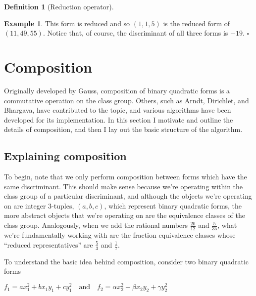 \documentclass{article}
\theoremstyle{definition}
\newtheorem{definition}{Definition}[section]
\theoremstyle{theorem}
\theoremstyle{example}
\newtheorem{example}{Example}[section]
\theoremstyle{corollary}
\begin{document}
\begin{definition}[Reduction operator]
\begin{example}
\bigskip

This form is reduced and so \((1, 1, 5)\) is the reduced form of \((11, 49, 55)\). Notice that, of course, the discriminant of all three forms is \(-19\). \(\square\)

\end{example}





\bigskip




\section{Composition}

\bigskip

Originally developed by Gauss, composition of binary quadratic forms is a commutative operation on the class group. Others, such as Arndt, Dirichlet, and Bhargava, have contributed to the topic, and various algorithms have been developed for its implementation. In this section I motivate and outline the details of composition, and then I lay out the basic structure of the algorithm.

\bigskip

\subsection{Explaining composition}

\bigskip

To begin, note that we only perform composition between forms which have the same discriminant. This should make sense because we're operating within the class group of a particular discriminant, and although the objects we're operating on are integer 3-tuples, \((a, b, c)\), which represent binary quadratic forms, the more abstract objects that we're operating on are the equivalence classes of the class group. Analogously, when we add the rational numbers \(\frac{20}{12}\) and \(\frac{5}{35}\), what we're fundamentally working with are the fraction equivalence classes whose ``reduced representatives'' are \(\frac{5}{3}\) and \(\frac{1}{7}\).

\bigskip

To understand the basic idea behind composition, consider two binary quadratic forms
\begin{center}
\(f_{1} = a x_{1}^{2} + b x_{1} y_{1} + c y_{1}^{2} \quad \textrm{and} \quad f_{2} = \alpha x_{2}^{2} + \beta x_{2} y_{2} + \gamma y_{2}^{2}\)
\end{center}


\end{definition}
\end{document}
